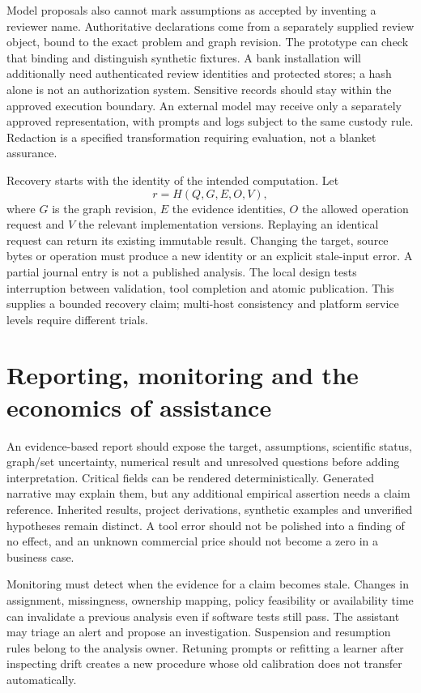 Model proposals also cannot mark assumptions as accepted by inventing a reviewer
name. Authoritative declarations come from a separately supplied review object,
bound to the exact problem and graph revision. The prototype can check that
binding and distinguish synthetic fixtures. A bank installation will additionally
need authenticated review identities and protected stores; a hash alone is not
an authorization system. Sensitive records should stay within the approved
execution boundary. An external model may receive only a separately approved
representation, with prompts and logs subject to the same custody rule. Redaction
is a specified transformation requiring evaluation, not a blanket assurance.

Recovery starts with the identity of the intended computation. Let
\[
 r=H(Q,G,E,O,V),
\]
where $G$ is the graph revision, $E$ the evidence identities, $O$ the allowed
operation request and $V$ the relevant implementation versions. Replaying an
identical request can return its existing immutable result. Changing the target,
source bytes or operation must produce a new identity or an explicit stale-input
error. A partial journal entry is not a published analysis. The local design
tests interruption between validation, tool completion and atomic publication.
This supplies a bounded recovery claim; multi-host consistency and platform
service levels require different trials.

\section{Reporting, monitoring and the economics of assistance}

An evidence-based report should expose the target, assumptions, scientific
status, graph/set uncertainty, numerical result and unresolved questions before
adding interpretation. Critical fields can be rendered deterministically.
Generated narrative may explain them, but any additional empirical assertion
needs a claim reference. Inherited results, project derivations, synthetic
examples and unverified hypotheses remain distinct. A tool error should not be
polished into a finding of no effect, and an unknown commercial price should
not become a zero in a business case.

Monitoring must detect when the evidence for a claim becomes stale. Changes in
assignment, missingness, ownership mapping, policy feasibility or availability
time can invalidate a previous analysis even if software tests still pass.
The assistant may triage an alert and propose an investigation. Suspension and
resumption rules belong to the analysis owner. Retuning prompts or refitting a
learner after inspecting drift creates a new procedure whose old calibration
does not transfer automatically.

